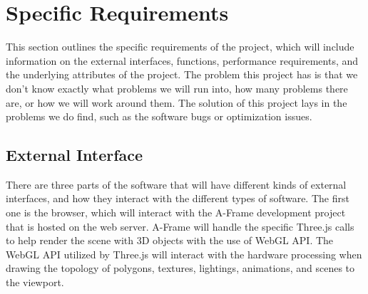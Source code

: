 \documentclass[letterpaper,10pt,titlepage,draftclsnofoot,onecolumn,compsoc,utf8,latin1]{IEEEtran}
\begin{document}
\section{Specific Requirements}
\begin{singlespace}
\noindent
This section outlines the specific requirements of the project, which will include information on the external interfaces, functions, performance requirements, and the underlying attributes of the project. The problem this project has is that we don't know exactly what problems we will run into, how many problems there are, or how we will work around them. The solution of this project lays in the problems we do find, such as the software bugs or optimization issues.

\subsection{External Interface}
\begin{singlespace}
\noindent
There are three parts of the software that will have different kinds of external interfaces, and how they interact with the different types of software. The first one is the browser, which will interact with the A-Frame development project that is hosted on the web server. A-Frame will handle the specific Three.js calls to help render the scene with 3D objects with the use of WebGL API. The WebGL API utilized by Three.js will interact with the hardware processing when drawing the topology of polygons, textures, lightings, animations, and scenes to the viewport. \\


\end{singlespace}
\end{singlespace}
\end{document}
